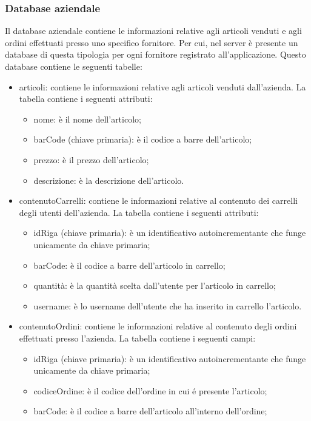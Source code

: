 \documentclass[12pt, a4paper, titlepage]{report}
\begin{document}
	\subsubsection{Database aziendale}
	
	Il database aziendale contiene le informazioni relative agli articoli venduti e agli ordini effettuati presso uno specifico fornitore. Per cui, nel server è presente un database di questa tipologia per ogni fornitore registrato all'applicazione. Questo database contiene le seguenti tabelle:
	\begin{itemize}
		\item articoli: contiene le informazioni relative agli articoli venduti dall'azienda. La tabella contiene i seguenti attributi:
		\begin{itemize}
			\item nome: è il nome dell'articolo;
			\item barCode (chiave primaria): è il codice a barre dell'articolo;
			\item prezzo: è il prezzo dell'articolo;
			\item descrizione: è la descrizione dell'articolo.
		\end{itemize}
		\item contenutoCarrelli: contiene le informazioni relative al contenuto dei carrelli degli utenti dell'azienda. La tabella contiene i seguenti attributi:
		\begin{itemize}
			\item idRiga (chiave primaria): è un identificativo autoincrementante che funge unicamente da chiave primaria;
			\item barCode: è il codice a barre dell'articolo in carrello;
			\item quantità: è la quantità scelta dall'utente per l'articolo in carrello;
			\item username: è lo username dell'utente che ha inserito in carrello l'articolo.
		\end{itemize}
		\item contenutoOrdini: contiene le informazioni relative al contenuto degli ordini effettuati presso l'azienda. La tabella contiene i seguenti campi:
		\begin{itemize}
			\item idRiga (chiave primaria): è un identificativo autoincrementante che funge unicamente da chiave primaria;
			\item codiceOrdine: è il codice dell'ordine in cui é presente l'articolo;
			\item barCode: è il codice a barre dell'articolo all'interno dell'ordine;

\end{itemize}
\end{itemize}
\end{document}

